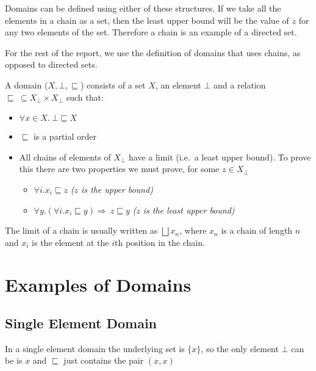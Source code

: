 Domains can be defined using either of these structures.  If we take all the elements in a chain as a set, then the least upper bound will be the value of $z$ for any two elements of the set. Therefore a chain is an example of a directed set.


For the rest of the report, we use the definition of domains that uses chains, as opposed to directed sets.
\vspace{0.5cm}
\begin{defn}
A domain ($X, \bot, \sqsubseteq$) consists of a set $X$, an element $\bot$ and a relation $\sqsubseteq \ \subseteq X_\bot \times X_\bot$ such that:

\begin{itemize}
\item{$\forall x \in X. \ \bot \sqsubseteq X$}
\item{$\sqsubseteq$ is a partial order}
\item{All chains of elements of $X_\bot$ have a limit (i.e.\ a least upper bound). To prove this there are two properties we must prove, for some $z \in X_\bot$}
\begin{itemize}
 \item{$\forall i. x_i \sqsubseteq z$ \hspace{1cm} \emph{($z$ is the upper bound)}}
 \item{$\forall y. (\forall i.x_i  \sqsubseteq y) \Rightarrow \ z \sqsubseteq y$ \hspace{0.25cm} \emph{($z$ is the least upper bound)}}
\end{itemize}
\end{itemize}

The limit of a chain is usually written as $\bigsqcup x_n$, where $x_n$ is a chain of length $n$ and $x_i$ is the element at the $i$th position in the chain.

\end{defn} 

\section{Examples of Domains}\label{ex}
\subsection{Single Element Domain}\label{single}
In a single element domain the underlying set is $\{x\}$, so the only element $\bot$ can be is $x$ and $\sqsubseteq$ just contains the pair $(x,x)$

